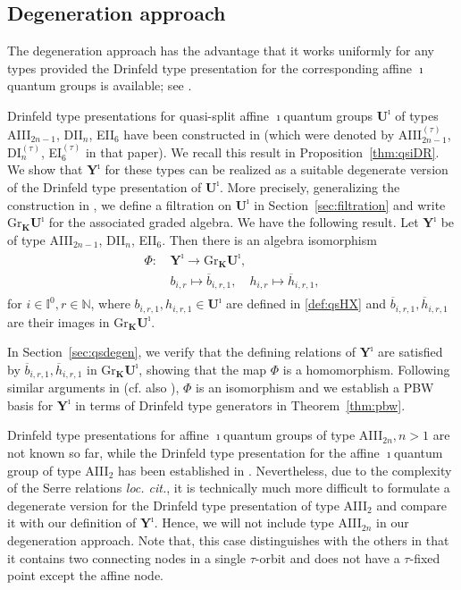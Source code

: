 \documentclass[11pt,reqno]{amsart}
\numberwithin{equation}{section}
\theoremstyle{definition}
\theoremstyle{remark}
\newcommand{\bK}{\mathbb{K}}
\newenvironment{customthm}[1]
	{\renewcommand\theinnercustomthm{#1}\innercustomthm}
	{\endinnercustomthm}
\newcommand{\Yi}{{\mathbf{Y}^\imath}}
\def \H{h}
\def \X{b}
\def \Gr{\mathrm{Gr}}
\def \I{\mathbb{I}}
\def \N{\mathbb{N}}
\def \Ui{\mathbf{U}^\imath}
\def \tUi{\mathbf{U}^\imath}
\def \bK{\mathbf{K}}
\def \ov{\overline}
\begin{document}
\subsection{Degeneration approach} The degeneration approach has the advantage that it works uniformly for any types provided the Drinfeld type presentation for the corresponding affine $\imath$quantum groups is available; see \cite{GM12,GTL13,KLWZ23b}. 

Drinfeld type presentations for quasi-split affine $\imath$quantum groups $\Ui$ of types AIII$_{2n-1}$, DII$_{n}$,  EII$_{6}$ have been constructed in \cite{LWZ23b} (which were denoted by AIII$_{2n-1}^{(\tau)}$, DI$_{n}^{(\tau)}$,  EI$_{6}^{(\tau)}$ in that paper). We recall this result in Proposition~\ref{thm:qsiDR}. We show that $\Yi$ for these types can be realized as a suitable degenerate version of the Drinfeld type presentation of $\Ui$.
More precisely, generalizing the construction in \cite{CG15,KLWZ23b}, we define a filtration on $\Ui$ in Section~\ref{sec:filtration} and write $\Gr_{\bK}\tUi$ for the associated graded algebra. We have the following result.
\begin{customthm} {\bf A} [Theorem~\ref{thm:main1}]
\label{th:A}
Let $\Yi$ be of type AIII$_{2n-1}$, DII$_{n}$, EII$_{6}$. Then there is an algebra isomorphism
\begin{align*}
\begin{split}
\Phi: &\, \Yi \longrightarrow \Gr_{\bK}\tUi, 
\\
&\, \X_{i,r}  \mapsto \ov{\X}_{i,r,1},\quad
\H_{i,r} \mapsto \ov{\H}_{i,r,1}, 
\end{split}
\end{align*}
for $i\in \I^0,r \in \N$, where $\X_{i,r,1}, \H_{i,r,1} \in \tUi$ are defined in \eqref{def:qsHX} and $\ov{\X}_{i,r,1},\ov{\H}_{i,r,1}$ are their images in $\Gr_{\bK}\tUi$. 
\end{customthm}

In Section~\ref{sec:qsdegen}, we verify that the defining relations of $\Yi$ are satisfied by $\ov{\X}_{i,r,1},\ov{\H}_{i,r,1}$ in $\Gr_{\bK}\tUi$,  showing that the map $\Phi$ is a homomorphism. Following similar arguments in \cite[Proof of Theorem 4.10]{KLWZ23b} (cf. also \cite{GM12}), $\Phi$ is an isomorphism and we establish a PBW basis for $\Yi$ in terms of Drinfeld type generators in Theorem~\ref{thm:pbw}.

Drinfeld type presentations for affine $\imath$quantum groups of type AIII$_{2n},n>1$ are not known so far, while the Drinfeld type presentation for the affine $\imath$quantum group of type AIII$_{2}$ has been established in \cite{LWZ23a}. Nevertheless, due to the complexity of the Serre relations {\em loc. cit.}, it is technically much more difficult to formulate a degenerate version for the Drinfeld type presentation of type AIII$_{2}$ and compare it with our definition of $\Yi$. Hence, we will not include type AIII$_{2n}$ in our degeneration approach. Note that, this case distinguishes with the others in that it contains two connecting nodes in a single $\tau$-orbit and does not have a $\tau$-fixed point except the affine node. 
\end{document}
